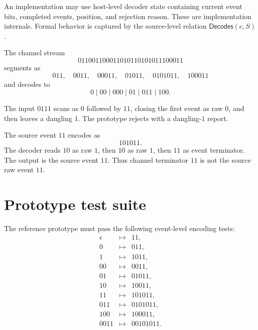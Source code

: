 \begin{definition}
\label{def:minimal-prototype-decoder-state}
An implementation may use host-level decoder state containing current event bits, completed events, position, and rejection reason. These are implementation internals. Formal behavior is captured by the source-level relation $\mathsf{Decodes}(c,S)$.
\end{definition}

\begin{example}
\label{ex:minimal-prototype-decode-completion}
The channel stream
$$
  011001100011010110101011100011
$$
segments as
$$
  011,\quad 0011,\quad 00011,\quad 01011,\quad 0101011,\quad 100011
$$
and decodes to
$$
  0\mid 00\mid 000\mid 01\mid 011\mid 100.
$$
\end{example}

\begin{example}[Rejecting $0111$]
\label{ex:minimal-prototype-reject-0111}
The input $0111$ scans as $0$ followed by $11$, closing the first event as raw $0$, and then leaves a dangling $1$. The prototype rejects with a dangling-$1$ report.
\end{example}

\begin{example}
\label{ex:minimal-prototype-source-11}
The source event $11$ encodes as
$$
  101011.
$$
The decoder reads $10$ as raw $1$, then $10$ as raw $1$, then $11$ as event terminator. The output is the source event $11$. Thus channel terminator $11$ is not the source raw event $11$.
\end{example}

\section{Prototype test suite}
\label{sec:minimal-prototype-test-suite}

\begin{definition}
\label{def:minimal-prototype-required-unit-tests}
The reference prototype must pass the following event-level encoding tests:
$$
\begin{array}{rcl}
  \epsilon &\mapsto& 11,\\
  0        &\mapsto& 011,\\
  1        &\mapsto& 1011,\\
  00       &\mapsto& 0011,\\
  01       &\mapsto& 01011,\\
  10       &\mapsto& 10011,\\
  11       &\mapsto& 101011,\\
  011      &\mapsto& 0101011,\\
  100      &\mapsto& 100011,\\
  0011     &\mapsto& 00101011.
\end{array}
$$
\end{definition}

